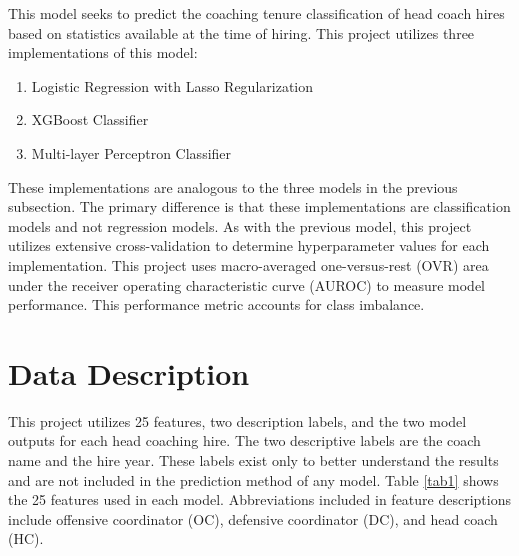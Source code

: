 \documentclass[conference]{IEEEtran}
\begin{document}
This model seeks to predict the coaching tenure classification of head coach hires based on statistics available at the time of hiring. This project utilizes three implementations of this model:
\begin{enumerate}
  \item Logistic Regression with Lasso Regularization\cite{b7}
  \item XGBoost Classifier\cite{b8}
  \item Multi-layer Perceptron Classifier\cite{b7}
\end{enumerate}
These implementations are analogous to the three models in the previous subsection. The primary difference is that these implementations are classification models and not regression models. As with the previous model, this project utilizes extensive cross-validation to determine hyperparameter values for each implementation. This project uses macro-averaged one-versus-rest (OVR) area under the receiver operating characteristic curve (AUROC) to measure model performance. This performance metric  accounts for class imbalance.

\section{Data Description}
This project utilizes 25 features, two description labels, and the two model outputs for each head coaching hire. The two descriptive labels are the coach name and the hire year. These labels exist only to better understand the results and are not included in the prediction method of any model. Table \ref{tab1} shows the 25 features used in each model. Abbreviations included in feature descriptions include offensive coordinator (OC), defensive coordinator (DC), and head coach (HC).
\end{document}
